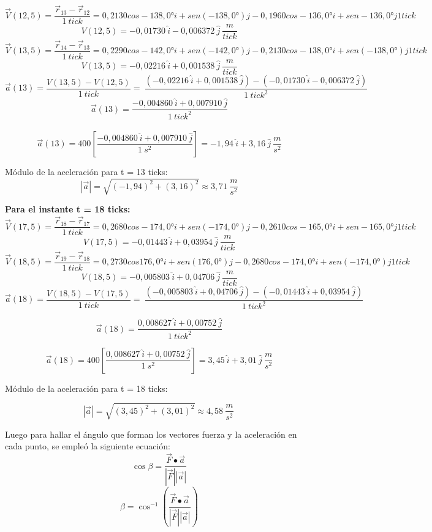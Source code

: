 \documentclass[../main.tex]{subfiles}
\begin{document}
\[\vec{V}\left(12,5\right)=\frac{{\vec{r}}_{13}-{\vec{r}}_{12}}{1\ tick}=0,2130cos-138,0°i+sen(-138,0°)j-0,1960cos-136,0°i+sen-136,0° j1 tick\]
\[V\left(12,5\right)=-0,01730\ \hat{i}-0,006372\ \hat{j}\ \frac{m}{tick}\]
\[\vec{V}\left(13,5\right)=\frac{{\vec{r}}_{14}-{\vec{r}}_{13}}{1\ tick}=0,2290cos-142,0°i+sen(-142,0°)j-0,2130cos-138,0°i+sen(-138,0°)j1 tick\]
\[V\left(13,5\right)=-0,02216\ \hat{i}+0,001538\ \hat{j}\ \frac{m}{tick}\]
\[\vec{a}\left(13\right)=\frac{V\left(13,5\right)-V\left(12,5\right)}{1\ tick}=\ \frac{\left(-0,02216\ \hat{i}+0,001538\ \hat{j}\right)-\left(-0,01730\ \hat{i}-0,006372\ \hat{j}\right)}{1\ {tick}^2}\]
\[\vec{a}\left(13\right)=\frac{-0,004860\ \hat{i}+0,007910\ \hat{j}}{1\ {tick}^2}\]\
\[\vec{a}\left(13\right)=400\left[\frac{-0,004860\ \hat{i}+0,007910\ \hat{j}}{1\ s^2}\right]=-1,94\ \hat{i}+3,16\ \hat{j}\ \frac{m}{s^2}\]

Módulo de la aceleración para t = 13 ticks:
\[\left|\vec{a}\right|=\sqrt{\left(-1,94\right)^2+\left(3,16\right)^2}\approx3,71\ \frac{m}{s^2}\]

\textbf{Para el instante t = 18 ticks:}
\[\vec{V}\left(17,5\right)=\frac{{\vec{r}}_{18}-{\vec{r}}_{17}}{1\ tick}=0,2680cos-174,0°i+sen(-174,0°)j-0,2610cos-165,0°i+sen-165,0° j1 tick\]
\[V\left(17,5\right)=-0,01443\ \hat{i}+0,03954\ \hat{j}\ \frac{m}{tick}\]
\[\vec{V}\left(18,5\right)=\frac{{\vec{r}}_{19}-{\vec{r}}_{18}}{1\ tick}=0,2730cos176,0°i+sen(176,0°)j-0,2680cos-174,0°i+sen(-174,0°)j1 tick\]
\[V\left(18,5\right)=-0,005803\ \hat{i}+0,04706\ \hat{j}\ \frac{m}{tick}\]
\[\vec{a}\left(18\right)=\frac{V\left(18,5\right)-V\left(17,5\right)}{1\ tick}=\ \frac{\left(-0,005803\ \hat{i}+0,04706\ \hat{j}\right)-\left(-0,01443\ \hat{i}+0,03954\ \hat{j}\right)}{1\ {tick}^2}\]

\[\vec{a}\left(18\right)=\frac{0,008627\ \hat{i}+0,00752\ \hat{j}}{1\ {tick}^2}\]

\[\vec{a}\left(18\right)=400\left[\frac{0,008627\ \hat{i}+0,00752\ \hat{j}}{1\ s^2}\right]=3,45\ \hat{i}+3,01\ \hat{j}\ \frac{m}{s^2}\]

Módulo de la aceleración para t = 18 ticks:

\[\left|\vec{a}\right|=\sqrt{\left(3,45\right)^2+\left(3,01\right)^2}\approx4,58\ \frac{m}{s^2}\ \]

Luego para hallar el ángulo que forman los vectores fuerza y la aceleración en cada punto, se empleó la siguiente ecuación:
\[ \cos{\beta}=\frac{\vec{F}\bullet\vec{a}}{\left|\vec{F}\right|\left|\vec{a}\right|} \]
\[ \beta=\cos^{-1}{\left(\frac{\vec{F}\bullet\vec{a}}{\left|\vec{F}\right|\left|\vec{a}\right|}\right)} \]
\end{document}
